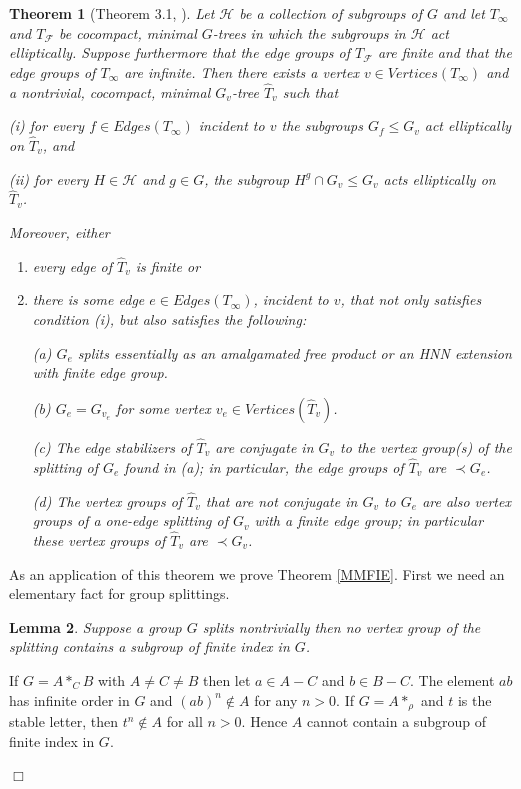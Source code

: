 \documentclass[12pt]{article}
\newtheorem{theorem}{Theorem}[subsection]
\newtheorem{lemma}[theorem]{Lemma}
\newenvironment{proof}{\addvspace{12pt}\noindent{\bf Proof:}}{
$\Box$\par\addvspace{12pt}}
\begin{document}
\begin{theorem} [Theorem 3.1, \cite{Tou15}] \label{Toui} Let $\mathcal H$  be a collection of subgroups of $G$ and let $T_\infty$ and $T_{\mathcal F}$ be cocompact, minimal $G$-trees in which the subgroups in $\mathcal H$ act elliptically.
Suppose furthermore that the edge groups of $T_{\mathcal F}$ are finite and that the edge groups of $T_\infty$ are infinite. Then there exists a vertex $v\in Vertices(T_\infty)$ and a nontrivial, cocompact, minimal $G_v$-tree $\hat T_v$ such that

\item (i) for every $f\in Edges(T_\infty)$ incident to $v$ the subgroups $G_f\leq G_v$ act elliptically
on $\hat T_v$, and

\item (ii) for every $H\in \mathcal H$ and $g\in G$, the subgroup $H^g \cap G_v\leq G_v$ acts elliptically on $\hat T_v$.


Moreover, either 
\begin{enumerate}

\item  every edge of $\hat T_v$ is finite or

\item  there is some edge $e\in Edges(T_\infty)$, incident to $v$, that not only satisfies condition (i), but
also satisfies the following:

\subitem (a) $G_e$ splits essentially as an amalgamated free product or an HNN extension
with finite edge group.

\subitem (b) $G_e = G_{v_e}$ for some vertex $v_e \in Vertices (\hat T_v)$.

\subitem (c) The edge stabilizers of $\hat T_v$ are conjugate in $G_v$ to the vertex group(s) of the
splitting of $G_e$ found in (a); in particular, the edge groups of $\hat T_v$ are $\prec G_e$. 

\subitem (d) The vertex groups of $\hat T_v$  that are not conjugate in $G_v$ to $G_e$ are also vertex groups of a one-edge splitting of $G_v$ with a finite edge group; in particular these vertex groups of $\hat T_v$ are $\prec G_v$.
\end{enumerate}
\end{theorem}

As an application of this theorem we prove Theorem \ref{MMFIE}.
First we need an elementary fact for group splittings.
\begin{lemma} \label{noFI}
Suppose a group $G$ splits nontrivially then no vertex group of the splitting contains a subgroup of finite index in $G$.
\end{lemma} 
\begin{proof}
If $G=A\ast_CB$ with $A\ne C\ne B$ then let $a\in A-C$ and $b\in B-C$. The element $ab$ has infinite order in $G$ and $(ab)^n\not\in A$ for any $n>0$. If $G=A\ast_\rho$ and $t$ is the stable letter, then $t^n\not\in A$ for all $n>0$. Hence $A$ cannot contain a subgroup of finite index in $G$. 
\end{proof}
\end{document}
